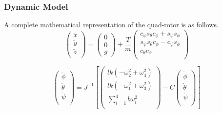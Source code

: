 \documentclass{beamer}
\begin{document}
\begin{frame}
\frametitle{Dynamic Model}
A complete mathematical representation of the quad-rotor is as follows.\\

\begin{equation}
    \label{lineareq}
    \left(
        \begin{array}{c}
           \ddot{x}\\
           \ddot{y}\\
           \ddot{z}\\
        \end{array}
    \right)
    = \left(
       \begin{array}{c}
        0\\
        0\\
        g
      \end{array}
    \right)
    +\frac{T}{m}
     \left(
        \begin{array}{c}
             c_{\psi}s_{\theta}c_{\phi} + s_{\psi}s_{\phi} \\
             s_{\psi}s_{\theta}c_{\phi} - c_{\psi}s_{\phi} \\
             c_{\theta} c_{\phi} \\
        \end{array}
    \right)
\end{equation}

\begin{equation}
    \label{angulareq}
    \left(
        \begin{array}{c}
           \ddot{\phi}\\
           \ddot{\theta}\\
           \ddot{\psi}\\
        \end{array}
    \right) = J^{-1}
    \left[ \left(
        \begin{array}{c}
            l k (-\omega_2^2 + \omega_4^2)\\
            l k (-\omega_1^2 + \omega_3^2)\\
            \sum \limits_{i=1}^4 b \omega_i^2\\
        \end{array}
    \right) -
    C
    \left(
        \begin{array}{c}
           \dot{\phi}\\
           \dot{\theta}\\
           \dot{\psi}\\
        \end{array}
    \right)
    \right]
\end{equation}

\end{frame}
\end{document}
